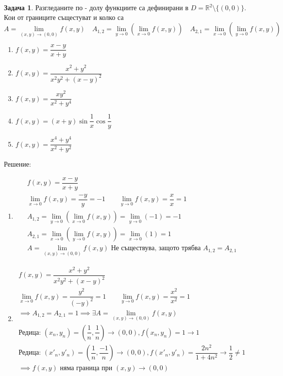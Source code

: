 \documentclass[a4paper,fleqn,12pt]{article}
\theoremstyle{definition}
\newtheorem{task}{Задача}[subsection]
\begin{document}
\begin{task}
Разгледаните по - долу функциите са дефинирани в $D = \mathbb{R}^2 \setminus \{ (0,0) \}$. Кои от границите същестуват и колко са
$$
A = \lim\limits_{(x,y) \to (0,0)} f(x,y) \quad
A_{1,2} = \lim\limits_{y \to 0} \left( \lim\limits_{x \to 0} f(x,y) \right) \quad
A_{2,1} = \lim\limits_{x \to 0} \left( \lim\limits_{y \to 0} f(x,y) \right) \quad
$$

\begin{enumerate}

\item $f(x,y) = \dfrac{x-y}{x+y}$
\item $f(x,y) = \dfrac{x^2 + y^2}{x^2y^2 + (x - y)^2}$
\item $f(x,y) = \dfrac{xy^2}{x^2+y^4}$
\item $f(x,y) = (x+y) \sin{\dfrac{1}{x}} \cos{\dfrac{1}{y}}$
\item $f(x,y) = \dfrac{x^4 + y^4}{x^2 + y^2}$

\end{enumerate}
Решение: 

\begin{enumerate}

\item 
\begin{gather*}
f(x,y) = \dfrac{x-y}{x+y} \\
\lim\limits_{x \to 0} f(x,y) = \dfrac{-y}{y} = -1 \qquad 
\lim\limits_{y \to 0} f(x,y) = \dfrac{x}{x} = 1 \\
A_{1,2} = \lim\limits_{y \to 0} \left( \lim\limits_{x \to 0} f(x,y) \right) = \lim\limits_{y \to 0} \left( -1 \right) = -1\\
A_{2,1} = \lim\limits_{x \to 0} \left( \lim\limits_{y \to 0} f(x,y) \right) = \lim\limits_{x \to 0} \left( 1 \right) = 1 \\
A = \lim\limits_{(x,y) \to (0,0)} f(x,y) \text{ Не съществува, защото трябва }A_{1,2} = A_{2,1}
\end{gather*}

\item 
\begin{gather*}
f(x,y) = \dfrac{x^2 + y^2}{x^2y^2 + (x - y)^2}\\
\lim\limits_{x \to 0} f(x,y) = \dfrac{y^2}{(-y)^2} = 1 \qquad 
\lim\limits_{y \to 0} f(x,y) = \dfrac{x^2}{x^2} = 1 \\
\implies A_{1,2} = A_{2,1} = 1 \implies \exists A = \lim\limits_{(x,y) \to (0,0)} f(x,y)\\
\text{Редица: }(x_n, y_n) = (\dfrac{1}{n},\dfrac{1}{n}) \to (0,0), f(x_n, y_n) = 1 \to 1\\
\text{Редица: }(x'_n, y'_n) = (\dfrac{1}{n},\dfrac{-1}{n})  \to (0,0), f(x'_n, y'_n) = \dfrac{2n^2}{1 + 4n^2} \to \dfrac{1}{2} \neq 1 \\
\implies f(x,y) \text{ няма граница при } (x,y) \to (0,0)
\end{gather*}


\end{enumerate}
\end{task}
\end{document}
